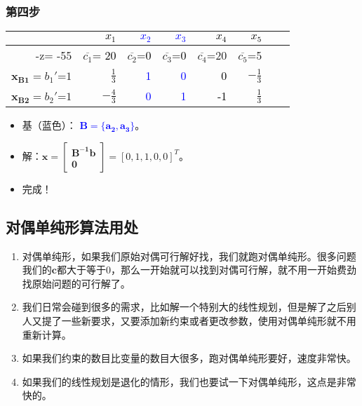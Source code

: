 	\subsubsection{第四步}
		\begin{table}[h]
		\centering
\begin{tabular}{r|rrrrrrr}\hline
  & \textcolor{black}{$x_1$} & \textcolor{blue}{$x_2$} & \textcolor{blue}{$x_3$} & \textcolor{black}{$x_4$} & \textcolor{black}{$x_5$} \\
\hline
 -z= -55 & $\overline{c_1}$= \textcolor{black}{20}  & $\overline{c_2}$=\textcolor{black}{0} & $\overline{c_3}$=\textcolor{black}{0} & $\overline{c_4}$=20 & $\overline{c_5}$=5  \\
 \hline
 $\mathbf{x_{B1}} = b_1'$=$1$& \textcolor{black}{$\frac{1}{3}$} & \textcolor{blue}{1}   & \textcolor{blue}{0} &  \textcolor{black}{0} & \textcolor{black}{$-\frac{1}{3}$}   \\
 $\mathbf{x_{B2}} = b_2'$=$1$ & \textcolor{black}{$-\frac{4}{3}$} & \textcolor{blue}{0} & \textcolor{blue}{1}  & \textcolor{black}{-1} & \textcolor{black}{$\frac{1}{3}$}  \\
\hline
\end{tabular}
\end{table}
	\begin{itemize}
		\item 基（蓝色）：\textcolor{blue}{ $\mathbf{B =\{a_2, a_3 \} }$}。
		\item 解：$\mathbf{x=\left[\begin{array}{c}\mathbf{B^{-1}b}\\\mathbf{0}\end{array}\right]}= [ 0, 1, 1, 0, 0 ]^T$。 
		\item 完成！
	\end{itemize}
	\subsection{对偶单纯形算法用处}
	\begin{enumerate}
		\item 对偶单纯形，如果我们原始对偶可行解好找，我们就跑对偶单纯形。很多问题我们的$\mathbf{c}$都大于等于0，那么一开始就可以找到对偶可行解，就不用一开始费劲找原始问题的可行解了。
		\item 我们日常会碰到很多的需求，比如解一个特别大的线性规划，但是解了之后别人又提了一些新要求，又要添加新约束或者更改参数，使用对偶单纯形就不用重新计算。
		\item 如果我们约束的数目比变量的数目大很多，跑对偶单纯形要好，速度非常快。
		\item 如果我们的线性规划是退化的情形，我们也要试一下对偶单纯形，这点是非常快的。
	\end{enumerate}



